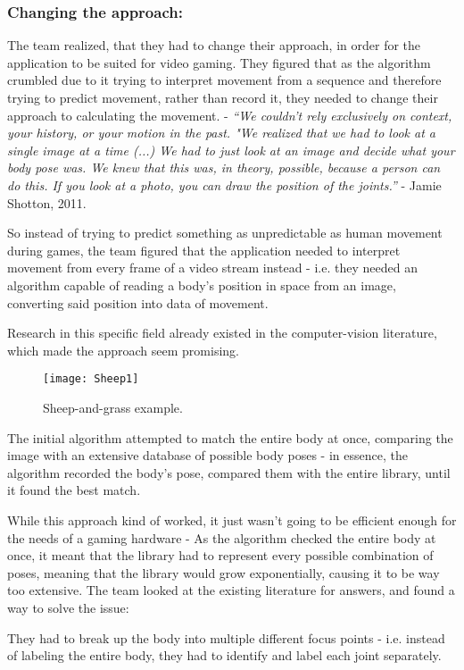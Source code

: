 \subsubsection*{Changing the approach:}
The team realized, that they had to change their approach, in order for the application to be suited for video gaming. They figured that as the algorithm crumbled due to it trying to interpret movement from a sequence and therefore trying to predict movement, rather than record it, they needed to change their approach to calculating the movement. - \textit{“We couldn’t rely exclusively on context, your history, or your motion in the past. "We realized that we had to look at a single image at a time (...) We had to just look at an image and decide what your body pose was. We knew that this was, in theory, possible, because a person can do this. If you look at a photo, you can draw the position of the joints.”} - Jamie Shotton, 2011.

So instead of trying to predict something as unpredictable as human movement during games, the team figured that the application needed to interpret movement from every frame of a video stream instead - i.e. they needed an algorithm capable of reading a body's position in space from an image, converting said position into data of movement.

Research in this specific field already existed in the computer-vision literature, which made the approach seem promising.

\begin{figure}[h] 
\centering
\texttt{[image: Sheep1]} 
\caption{Sheep-and-grass example.}
\label{fig:Sheep}
\end{figure}
\bigskip

The initial algorithm attempted to match the entire body at once, comparing the image with an extensive database of possible body poses - in essence, the algorithm recorded the body's pose, compared them with the entire library, until it found the best match.

While this approach kind of worked, it just wasn't going to be efficient enough for the needs of a gaming hardware - As the algorithm checked the entire body at once, it meant that the library had to represent every possible combination of poses, meaning that the library would grow exponentially, causing it to be way too extensive. \parencite{Knies}
The team looked at the existing literature for answers, and found a way to solve the issue:

They had to break up the body into multiple different focus points - i.e. instead of labeling the entire body, they had to identify and label each joint separately.

